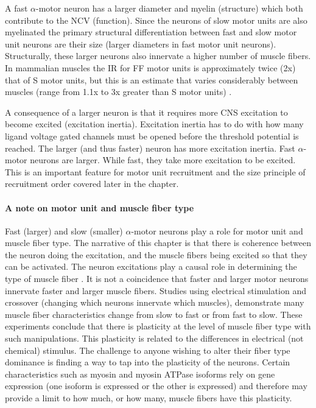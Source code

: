 A fast $\alpha$-motor neuron has a larger diameter and myelin (structure) which both contribute to the NCV (function). Since the neurons of slow motor units are also myelinated the primary structural differentiation between fast and slow motor unit neurons are their size (larger diameters in fast motor unit neurons). Structurally, these larger neurons also innervate a higher number of muscle fibers. In mammalian muscles the IR for FF motor units is approximately twice (2x) that of S motor units, but this is an estimate that varies considerably between muscles (range from 1.1x to 3x greater than S motor units) \cite{bodine_maximal_1987}. 

A consequence of a larger neuron is that it requires more CNS excitation to become excited (excitation inertia). Excitation inertia has to do with how many ligand voltage gated channels must be opened before the threshold potential is reached. The larger (and thus faster) neuron has more excitation inertia. Fast $\alpha$-motor neurons are larger. While fast, they take more excitation to be excited. This is an important feature for motor unit recruitment and the size principle of recruitment order covered later in the chapter.

\paragraph{A note on motor unit and muscle fiber type}
Fast (larger) and slow (smaller) $\alpha$-motor neurons play a role for motor unit and muscle fiber type. The narrative of this chapter is that there is coherence between the neuron doing the excitation, and the muscle fibers being excited so that they can be activated. The neuron excitations play a causal role in determining the type of muscle fiber \cite{buchthal_motor_1980}. It is not a coincidence that faster and larger motor neurons innervate faster and larger muscle fibers. Studies using electrical stimulation and crossover (changing which neurons innervate which muscles), demonstrate many muscle fiber characteristics change from slow to fast or from fast to slow. These experiments conclude that there is plasticity at the level of muscle fiber type with such manipulations. This plasticity is related to the differences in electrical (not chemical) stimulus. The challenge to anyone wishing to alter their fiber type dominance is finding a way to  tap into the plasticity of the neurons. Certain characteristics such as myosin and myosin ATPase isoforms rely on gene expression (one isoform is expressed or the other is expressed) and therefore may provide a limit to how much, or how many, muscle fibers have this plasticity.

